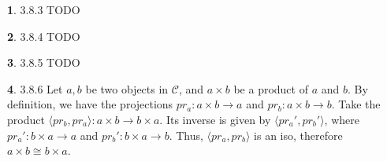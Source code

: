 \documentclass{article}
\theoremstyle{definition}
\newcommand{\CC}{\mathscr{C}}
\theoremstyle{definition}
\theoremstyle{definition}
\newtheorem{solution-internal}{}[subsection]
\newenvironment{solution}{
  \begin{solution-internal}
}{
  \end{solution-internal}
}
\begin{document}
\begin{solution}
  3.8.3 TODO
\end{solution}
\begin{solution}
  3.8.4 TODO
\end{solution}
\begin{solution}
  3.8.5 TODO
\end{solution}
\begin{solution}
  3.8.6 Let $a, b$ be two objects in $\CC$, and $a \times b$ be a product of $a$
  and $b$. By definition, we have the projections $pr_a\colon a \times b \to a$
  and $pr_b\colon a \times b \to b$. Take the product $\langle pr_b, pr_a
  \rangle\colon a \times b \to b \times a$. Its inverse is given by $\langle
  pr_a', pr_b'\rangle$, where $pr_a'\colon b \times a \to a$ and $pr_b' \colon b
  \times a \to b$. Thus, $\langle pr_a, pr_b \rangle$ is an iso, therefore
  $a\times b \cong b \times a$.
  \begin{center}
  \end{center}
\end{solution}


\end{document}
